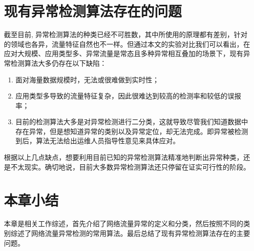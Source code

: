 





\section{现有异常检测算法存在的问题}
截至目前, 异常检测算法的种类已经不可胜数，其中所使用的原理都有差别，针对的领域也各异，流量特征自然也不一样。但通过本文的实验对比我们可以看出，在应对大规模、应用类型多、异常流量是常态且多种异常相互叠加的场景下，现有异常检测算法大多仍存在以下缺陷：

\begin{enumerate}
  \item 面对海量数据规模时，无法或很难做到实时性；
  \item 应用类型多导致的流量特征复杂，因此很难达到较高的检测率和较低的误报率；
  \item 目前的检测算法大多是对异常检测进行二分类，这就导致尽管我们知道数据中存在异常，但是想知道异常的类别以及异常定位，却无法完成。即异常被检测到后，算法无法给出运维人员指导性意见来具体应对。
\end{enumerate}

根据以上几点缺点，想要利用目前已知的异常检测算法精准地判断出异常种类，还是不太现实。确切地说，目前大多数异常检测算法还只停留在证实可行性的阶段。

\section{本章小结}
本章是相关工作综述，首先介绍了网络流量异常的定义和分类，然后按照不同的类别综述了网络流量异常检测的常用算法。最后总结了现有异常检测算法存在的主要问题。

